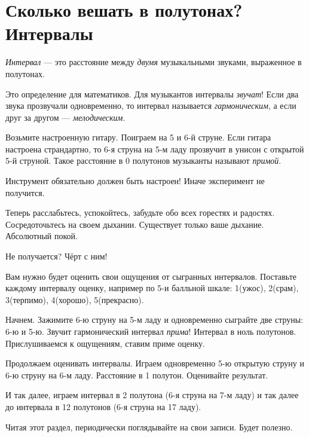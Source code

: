 \section{Сколько вешать в полутонах? Интервалы}
\label{ch:harmony:interval}

\begin{Definition}[Интервал]
    \emph{Интервал} --- это расстояние между \emph{двумя} музыкальными звуками, выраженное в полутонах. 
\end{Definition}

Это определение для математиков. Для музыкантов интервалы \emph{звучат}! Если два звука прозвучали одновременно, то интервал называется \emph{гармоническим}, а если друг за другом --- \emph{мелодическим}.

\begin{Example}
    \label{ex:harmony:interval:string5and6}
    Возьмите настроенную гитару. Поиграем на 5 и 6-й струне. Если гитара настроена страндартно, то 6-я струна на 5-м ладу прозвучит в унисон с открытой 5-й струной. Такое расстояние в 0 полутонов музыканты называют \emph{примой}. 
    
    Инструмент обязательно должен быть настроен! Иначе эксперимент не получится.
    
    Теперь расслабьтесь, успокойтесь, забудьте обо всех горестях и радостях. Сосредоточьтесь на своем дыхании. Существует только ваше дыхание. Абсолютный покой. 
    
    Не получается? Чёрт с ним!

    Вам нужно будет оценить свои ощущения от сыгранных интервалов. Поставьте каждому интервалу оценку, например по 5-и балльной шкале: 1(ужос), 2(срам), 3(терпимо), 4(хорошо), 5(прекрасно).
    
    Начнем. Зажимите 6-ю струну на 5-м ладу и одновременно сыграйте две струны: 6-ю и 5-ю. Звучит гармонический интервал \emph{прима}! Интервал в ноль полутонов. Прислушиваемся к ощущениям, ставим приме оценку.
    
    Продолжаем оценивать интервалы. Играем одновременно 5-ю открытую струну и 6-ю струну на 6-м ладу. Расстояние в 1 полутон. Оценивайте результат.
    
    И так далее, играем интервал в 2 полутона (6-я струна на 7-м ладу) и так далее до интервала в 12 полутонов (6-я струна на 17 ладу). 
    
    Читая этот раздел, периодически поглядывайте на свои записи. Будет полезно.
\end{Example}

